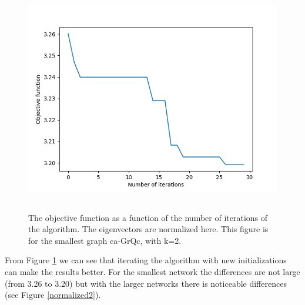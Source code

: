 \documentclass{article}
\begin{document}
\begin{figure}[htb]
\begin{center} 
\includegraphics[height=10cm]{plot2.png}
\end{center}
\caption{The objective function as a function of the number of iterations of the algorithm.
The eigenvectors are normalized here. This figure is for the smallest graph ca-GrQc, with k=2.}
\label{plot1}
\end{figure}

From Figure \ref{plot1} we can see that iterating the algorithm with
new initializations can make the results better. For the smallest
network the differences are not large (from 3.26 to 3.20) but with the
larger networks there is noticeable differences (see Figure \ref{normalized2}).
\clearpage
\end{document}
